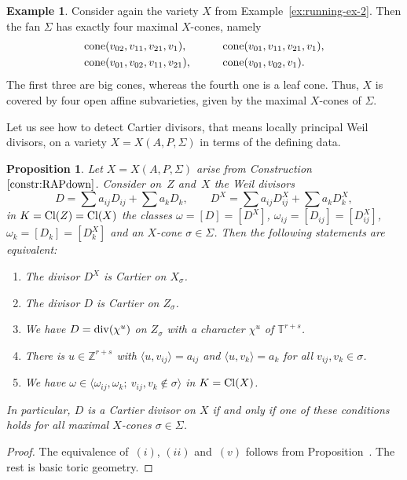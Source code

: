 \documentclass[10pt,a4paper]{amsart}
\newtheorem{prop}[thm]{Proposition}
\theoremstyle{definition}
\newtheorem{exam}[thm]{Example}
\def\Cl{{\rm Cl}}
\def\TT{{\mathbb T}}
\def\ZZ{{\mathbb Z}}
\def\div{{\rm div}}
\def\bangle#1{{\langle #1 \rangle}}
\def\cone{{\rm cone}}
\numberwithin{equation}{section}
\begin{document}
\begin{exam}
\label{ex:running-ex-3}
Consider again the variety $X$
from Example~\ref{ex:running-ex-2}.
Then the fan $\Sigma$ has exactly four
maximal $X$-cones, namely
\begin{alignat*}{4}
&\cone(v_{02},v_{11},v_{21},v_1),
\qquad&&
\cone(v_{01},v_{11},v_{21},v_1),
\\
&\cone(v_{01},v_{02},v_{11},v_{21}),
\qquad&&
\cone(v_{01},v_{02},v_1).
\end{alignat*}
The first three are big cones, whereas the
fourth one is a leaf cone.
Thus, $X$ is covered by four open
affine subvarieties, given by the maximal
$X$-cones of $\Sigma$.
\end{exam}


Let us see how to detect Cartier divisors,
that means locally principal Weil divisors,
on a variety $X = X(A,P,\Sigma)$ in terms of
the defining data.


\begin{prop}
\label{prop:gorchar}
Let $X = X(A,P,\Sigma)$ arise from
Construction~$\ref{constr:RAPdown}$.
Consider on~$Z$ and~$X$ the Weil
divisors
\[
D =\sum a_{ij} D_{ij} + \sum a_k D_k,\qquad
D^X =\sum a_{ij} D^X_{ij} + \sum a_k D^X_k,
\]
in $K = \Cl(Z) = \Cl(X)$ the classes $\omega = [D] = [D^X]$,
$\omega_{ij} = [D_{ij}] = [D_{ij}^X]$,
$\omega_k = [D_k] = [D_k^X]$
and an $X$-cone $\sigma \in \Sigma$.
Then the following statements are equivalent:
\begin{enumerate}\itemsep=0pt
\item[$(i)$]
The divisor $D^X$ is Cartier on $X_\sigma$.
\item[$(ii)$]
The divisor $D$ is Cartier on $Z_\sigma$.
\item[$(iii)$]
We have $D = \div(\chi^u)$ on $Z_\sigma$ with
a character $\chi^u$ of $\TT^{r+s}$.
\item[$(iv)$]
There is $u \in \ZZ^{r+s}$ with
$\bangle{u,v_{ij}} = a_{ij}$ and
$\bangle{u,v_k} = a_k$ for all
$v_{ij}, v_k \in \sigma$.
\item[$(v)$]
We have
$\omega \in \bangle{\omega_{ij}, \omega_k; \ v_{ij}, v_k \not\in \sigma}$
in $K = \Cl(X)$.
\end{enumerate}
In particular, $D$ is a Cartier divisor on $X$
if and only if one of these conditions holds
for all maximal $X$-cones $\sigma \in \Sigma$.
\end{prop}

\begin{proof}
The equivalence of~$(i)$, $(ii)$ and~$(v)$ follows from
Proposition~\cite[Proposition~3.3.1.5]{ArDeHaLa}.
The rest is basic toric geometry.
\end{proof}
\end{document}
